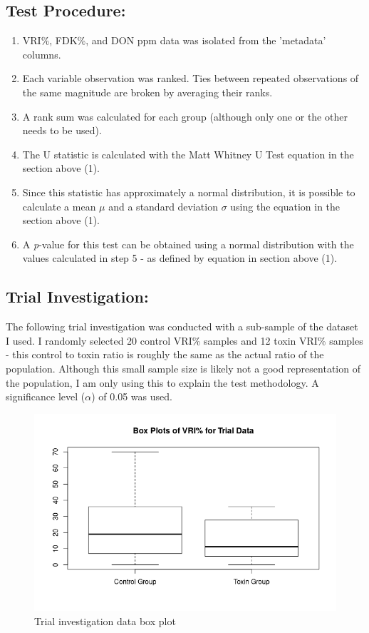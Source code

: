 \documentclass[11pt]{article}
\begin{document}
\subsection{Test Procedure:}
\label{sec:orgde6489b}
\begin{enumerate}
\item VRI\%, FDK\%, and DON ppm data was isolated from the 'metadata' columns.
\item Each variable observation was ranked. Ties between repeated observations of the same magnitude are broken by averaging their ranks.
\item A rank sum was calculated for each group (although only one or the other needs to be used).
\item The U statistic is calculated with the Matt Whitney U Test equation in the section above (1).
\item Since this statistic has approximately a normal distribution, it is possible to calculate a mean \(\mu\) and a standard deviation \(\sigma\) using the equation in the section above (1).
\item A \textit{p}-value for this test can be obtained using a normal distribution with the values calculated in step 5 - as defined by equation in section above (1).
\end{enumerate}
\subsection{Trial Investigation:}
\label{sec:orgb82a222}
The following trial investigation was conducted with a sub-sample of the dataset I used. I randomly selected 20 control VRI\% samples and 12 toxin VRI\% samples - this control to toxin ratio is roughly the same as the actual ratio of the population. 
Although this small sample size is likely not a good representation of the population, I am only using this to explain
the test methodology. A significance level (\(\alpha\)) of 0.05 was used.

\begin{figure}[h]
\centering
\includegraphics[width=\textwidth]{test}
\caption{Trial investigation data box plot}
\end{figure}
\end{document}
